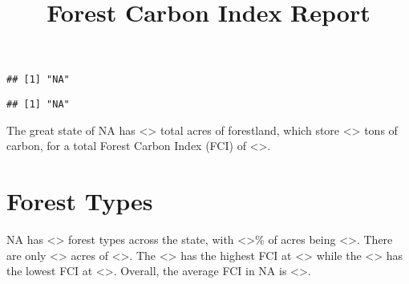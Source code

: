 \documentclass[
]{article}
\title{Forest Carbon Index Report}
\author{}
\date{\vspace{-2.5em}}
\newenvironment{Shaded}{\begin{snugshade}}{\end{snugshade}}
\newcommand{\CommentTok}[1]{\textcolor[rgb]{0.56,0.35,0.01}{\textit{#1}}}
\newcommand{\ControlFlowTok}[1]{\textcolor[rgb]{0.13,0.29,0.53}{\textbf{#1}}}
\newcommand{\KeywordTok}[1]{\textcolor[rgb]{0.13,0.29,0.53}{\textbf{#1}}}
\newcommand{\NormalTok}[1]{#1}
\newcommand{\OperatorTok}[1]{\textcolor[rgb]{0.81,0.36,0.00}{\textbf{#1}}}
\newcommand{\StringTok}[1]{\textcolor[rgb]{0.31,0.60,0.02}{#1}}
\begin{document}
\maketitle

\begin{Shaded}
\end{Shaded}

\begin{verbatim}
## [1] "NA"
\end{verbatim}

\begin{Shaded}
\end{Shaded}

\begin{verbatim}
## [1] "NA"
\end{verbatim}

The great state of NA has \textless{}\textgreater{} total acres of
forestland, which store \textless{}\textgreater{} tons of carbon, for a
total Forest Carbon Index (FCI) of \textless{}\textgreater.

\hypertarget{forest-types}{%
\section{Forest Types}\label{forest-types}}

NA has \textless{}\textgreater{} forest types across the state, with
\textless{}\textgreater\% of acres being \textless{}\textgreater. There
are only \textless{}\textgreater{} acres of \textless{}\textgreater. The
\textless{}\textgreater{} has the highest FCI at
\textless{}\textgreater{} while the \textless{}\textgreater{} has the
lowest FCI at \textless{}\textgreater. Overall, the average FCI in NA is
\textless{}\textgreater.

\begin{Shaded}
\end{Shaded}
\end{document}
